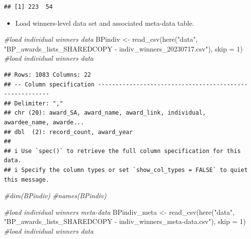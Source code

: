 \documentclass[
]{article}
\newenvironment{Shaded}{\begin{snugshade}}{\end{snugshade}}
\newcommand{\AttributeTok}[1]{\textcolor[rgb]{0.77,0.63,0.00}{#1}}
\newcommand{\CommentTok}[1]{\textcolor[rgb]{0.56,0.35,0.01}{\textit{#1}}}
\newcommand{\DecValTok}[1]{\textcolor[rgb]{0.00,0.00,0.81}{#1}}
\newcommand{\DocumentationTok}[1]{\textcolor[rgb]{0.56,0.35,0.01}{\textbf{\textit{#1}}}}
\newcommand{\FunctionTok}[1]{\textcolor[rgb]{0.00,0.00,0.00}{#1}}
\newcommand{\NormalTok}[1]{#1}
\newcommand{\OtherTok}[1]{\textcolor[rgb]{0.56,0.35,0.01}{#1}}
\newcommand{\SpecialCharTok}[1]{\textcolor[rgb]{0.00,0.00,0.00}{#1}}
\newcommand{\StringTok}[1]{\textcolor[rgb]{0.31,0.60,0.02}{#1}}
\providecommand{\tightlist}{%
  \setlength{\itemsep}{0pt}\setlength{\parskip}{0pt}}
\begin{document}
\begin{verbatim}
## [1] 223  54
\end{verbatim}

\begin{Shaded}
\end{Shaded}

\begin{itemize}
\tightlist
\item
  Load winners-level data set and associated meta-data table.
\end{itemize}

\begin{Shaded}
\begin{Highlighting}[]
\CommentTok{\#load individual winners data}
\NormalTok{BPindiv }\OtherTok{\textless{}{-}} \FunctionTok{read\_csv}\NormalTok{(}\FunctionTok{here}\NormalTok{(}\StringTok{"data"}\NormalTok{, }\StringTok{"BP\_awards\_lists\_SHAREDCOPY {-} indiv\_winners\_20230717.csv"}\NormalTok{), }\AttributeTok{skip =} \DecValTok{1}\NormalTok{) }\CommentTok{\#load individual winners data}
\end{Highlighting}
\end{Shaded}

\begin{verbatim}
## Rows: 1083 Columns: 22
## -- Column specification --------------------------------------------------------
## Delimiter: ","
## chr (20): award_SA, award_name, award_link, individual, awardee_name, awarde...
## dbl  (2): record_count, award_year
## 
## i Use `spec()` to retrieve the full column specification for this data.
## i Specify the column types or set `show_col_types = FALSE` to quiet this message.
\end{verbatim}

\begin{Shaded}
\begin{Highlighting}[]
\CommentTok{\#dim(BPindiv)}
\CommentTok{\#names(BPindiv)}

\CommentTok{\#load individual winners meta{-}data}
\NormalTok{BPindiv\_meta }\OtherTok{\textless{}{-}} \FunctionTok{read\_csv}\NormalTok{(}\FunctionTok{here}\NormalTok{(}\StringTok{"data"}\NormalTok{, }\StringTok{"BP\_awards\_lists\_SHAREDCOPY {-} indiv\_winners\_meta{-}data.csv"}\NormalTok{), }\AttributeTok{skip =} \DecValTok{1}\NormalTok{) }\CommentTok{\#load individual winners data}
\end{Highlighting}
\end{Shaded}
\end{document}
